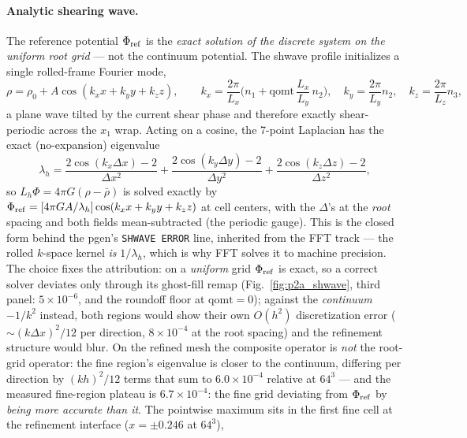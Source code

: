 \documentclass[11pt]{article}
\newcommand{\code}[1]{\texttt{#1}}
\begin{document}
\paragraph{Analytic shearing wave.}
The reference potential $\Phi_{\rm ref}$ is the \emph{exact solution of the
discrete system on the uniform root grid} --- not the continuum potential. The
shwave profile initializes a single rolled-frame Fourier mode,
\begin{equation}
\rho = \rho_0 + A\cos(k_x x + k_y y + k_z z), \qquad
k_x = \frac{2\pi}{L_x}\Big(n_1 + \mathrm{qomt}\,\frac{L_x}{L_y}\,n_2\Big),\quad
k_y = \frac{2\pi}{L_y}n_2,\quad k_z = \frac{2\pi}{L_z}n_3,
\end{equation}
a plane wave tilted by the current shear phase and therefore exactly
shear-periodic across the $x_1$ wrap. Acting on a cosine, the 7-point Laplacian
has the exact (no-expansion) eigenvalue
\begin{equation}
\lambda_h = \frac{2\cos(k_x\Delta x)-2}{\Delta x^2}
          + \frac{2\cos(k_y\Delta y)-2}{\Delta y^2}
          + \frac{2\cos(k_z\Delta z)-2}{\Delta z^2},
\label{eq:disc_eig}
\end{equation}
so $L_h\Phi = 4\pi G(\rho-\bar\rho)$ is solved exactly by
$\Phi_{\rm ref} = [4\pi G A/\lambda_h]\cos(k_x x + k_y y + k_z z)$ at cell
centers, with the $\Delta$'s at the \emph{root} spacing and both fields
mean-subtracted (the periodic gauge). This is the closed form behind the pgen's
\code{SHWAVE ERROR} line, inherited from the FFT track --- the rolled $k$-space
kernel \emph{is} $1/\lambda_h$, which is why FFT solves it to machine precision.
The choice fixes the attribution: on a \emph{uniform} grid $\Phi_{\rm ref}$ is
exact, so a correct solver deviates only through its ghost-fill remap
(Fig.~\ref{fig:p2a_shwave}, third panel: $5\times10^{-6}$, and the roundoff floor
at $\mathrm{qomt}=0$); against the \emph{continuum} $-1/k^2$ instead, both
regions would show their own $O(h^2)$ discretization error
($\sim\!(k\Delta x)^2/12$ per direction, $8\times10^{-4}$ at the root spacing)
and the refinement structure would blur. On the refined mesh the composite
operator is \emph{not} the root-grid operator: the fine region's eigenvalue is
closer to the continuum, differing per direction by $(k h)^2/12$ terms that sum
to $6.0\times10^{-4}$ relative at $64^3$ --- and the measured fine-region
plateau is $6.7\times10^{-4}$: the fine grid deviating from $\Phi_{\rm ref}$ by
\emph{being more accurate than it}. The pointwise maximum sits in
the first fine cell at the refinement interface ($x = \pm 0.246$ at $64^3$),
\end{document}
